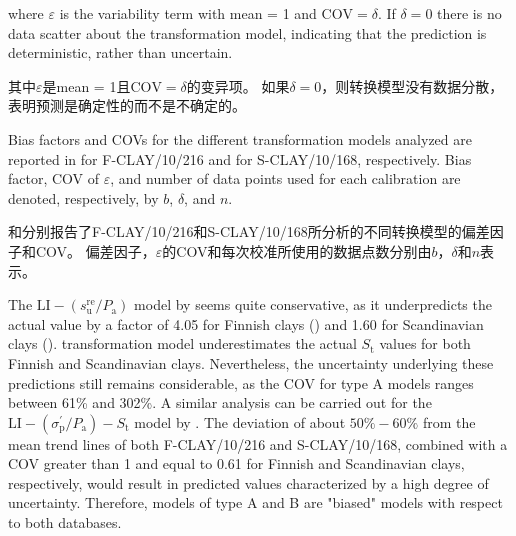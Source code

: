 \begin{ParaColumn}
    \switchcolumn*

    \noindent
    where $\varepsilon$ is the variability term with mean = 1 and $\mathrm{COV}=\delta$. If $\delta=0$ there is no data scatter about the transformation model, indicating that the prediction is deterministic, rather than uncertain.

    \switchcolumn

    \noindent
    其中$\varepsilon$是mean = 1且$\mathrm{COV}=\delta$的变异项。 如果$\delta=0$，则转换模型没有数据分散，表明预测是确定性的而不是不确定的。

    \switchcolumn*

    Bias factors and COVs for the different transformation models analyzed are reported in  for F-CLAY/10/216 and  for S-CLAY/10/168, respectively. Bias factor, COV of $\varepsilon$, and number of data points used for each calibration are denoted, respectively, by $b$, $\delta$, and $n$.

    \switchcolumn

    和分别报告了F-CLAY/10/216和S-CLAY/10/168所分析的不同转换模型的偏差因子和COV。 偏差因子，$\varepsilon$的COV和每次校准所使用的数据点数分别由$b$，$\delta$和$n$表示。

    \CrossColumnText{
        
    }
    \switchcolumn*

    The $\mathrm{LI}-\left(s_{\mathrm{u}}^{\mathrm{re}}/P_{\mathrm{a}}\right)$ model by \citet{Locat1988799} seems quite conservative, as it underpredicts the actual value by a factor of 4.05 for Finnish clays () and 1.60 for Scandinavian clays (). \citet{Bjerrum195449} transformation model underestimates the actual $S_{\mathrm{t}}$ values for both Finnish and Scandinavian clays. Nevertheless, the uncertainty underlying these predictions still remains considerable, as the COV for type A models ranges between 61\% and 302\%. A similar analysis can be carried out for the $\mathrm{LI}-\left(\sigma_{\mathrm{p}}^{\prime}/P_{\mathrm{a}}\right)-S_{\mathrm{t}}$ model by \citet{Ching2012522}. The deviation of about $50\%-60\%$ from the mean trend lines of both F-CLAY/10/216 and S-CLAY/10/168, combined with a COV greater than 1 and equal to 0.61 for Finnish and Scandinavian clays, respectively, would result in predicted values characterized by a high degree of uncertainty. Therefore, models of type A and B are "biased" models with respect to both databases.


\end{ParaColumn}
